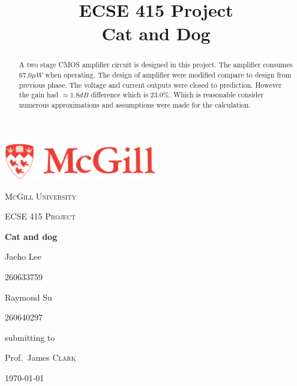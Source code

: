 \documentclass[conference,compsoc]{IEEEtran}
\begin{document}
\begin{titlepage}
	\centering
	\includegraphics[width=0.5\textwidth]{McGill_Logo}\par\vspace{1cm}
	{\scshape\LARGE McGill University \par}
	\vspace{1cm}
	{\scshape\Large ECSE 415 Project\par}
	\vspace{1.5cm}
	{\huge\bfseries Cat and dog\par}
	\vspace{2cm}
	{\Large Jaeho Lee\par}
	{ 260633759\par} {\Large Raymond Su \par} {260640297 \par}
	\vfill
	submitting to\par
	Prof.~James \textsc{Clark}

	\vfill

	{\large \today\par}
\end{titlepage}
%
\title{ECSE 415 Project\\ Cat and Dog}
\author{
}

\maketitle

\begin{abstract}
A two stage CMOS amplifier circuit is designed in this project. The amplifier consumes \(67.0\mu W\) when operating. The design of amplifier were modified compare to design from previous phase. The voltage and current outputs were closed to prediction. However the gain had \(\approx 1.8 dB\) difference which is \(23.0 \%\). Which is reasonable consider numerous approximations and assumptions were made for the calculation.
\end{abstract}
\end{document}
